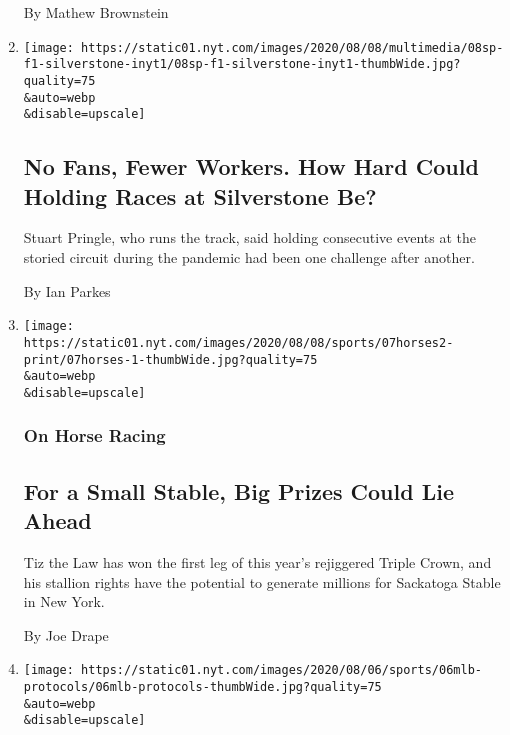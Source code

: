 \begin{enumerate}
  By Mathew Brownstein
\item
  \href{/2020/08/07/sports/autoracing/formula-1-silverstone-pandemic.html}{}

  \texttt{[image: https://static01.nyt.com/images/2020/08/08/multimedia/08sp-f1-silverstone-inyt1/08sp-f1-silverstone-inyt1-thumbWide.jpg?quality=75\\\&auto=webp\\\&disable=upscale]}

  \hypertarget{no-fans-fewer-workers-how-hard-could-holding-races-at-silverstone-be}{%
  \subsection{No Fans, Fewer Workers. How Hard Could Holding Races at
  Silverstone
  Be?}\label{no-fans-fewer-workers-how-hard-could-holding-races-at-silverstone-be}}

  Stuart Pringle, who runs the track, said holding consecutive events at
  the storied circuit during the pandemic had been one challenge after
  another.

  By Ian Parkes
\item
  \href{/2020/08/07/sports/tiz-the-law-millions.html}{}

  \texttt{[image: https://static01.nyt.com/images/2020/08/08/sports/07horses2-print/07horses-1-thumbWide.jpg?quality=75\\\&auto=webp\\\&disable=upscale]}

  \hypertarget{on-horse-racing}{%
  \subsubsection{On Horse Racing}\label{on-horse-racing}}

  \hypertarget{for-a-small-stable-big-prizes-could-lie-ahead}{%
  \subsection{For a Small Stable, Big Prizes Could Lie
  Ahead}\label{for-a-small-stable-big-prizes-could-lie-ahead}}

  Tiz the Law has won the first leg of this year's rejiggered Triple
  Crown, and his stallion rights have the potential to generate millions
  for Sackatoga Stable in New York.

  By Joe Drape
\item
  \href{/2020/08/06/sports/baseball/mlb-safety-protocols.html}{}

  \texttt{[image: https://static01.nyt.com/images/2020/08/06/sports/06mlb-protocols/06mlb-protocols-thumbWide.jpg?quality=75\\\&auto=webp\\\&disable=upscale]}


\end{enumerate}
